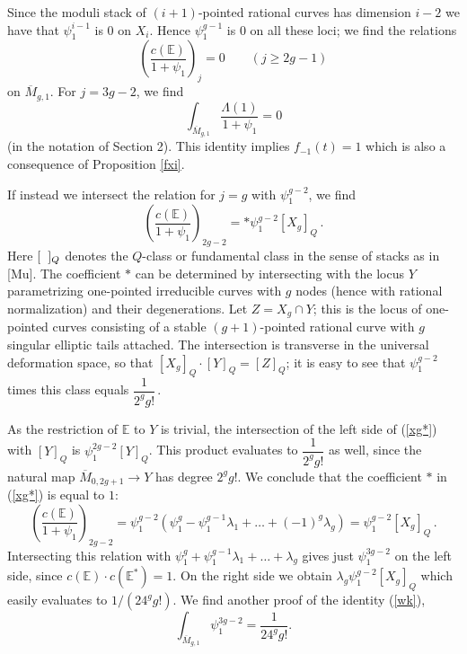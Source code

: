 \documentclass[11 pt]{amsart}
\newcommand{\HH}{\Lambda}
\newcommand{\hodge}{\mathbb{E}}
\begin{document}
Since the moduli stack of $(i+1)$-pointed rational curves has dimension
$i-2$ we have that $\psi_1^{i-1}$ is 0 on $X_i$. Hence $\psi_1^{g-1}$
is 0 on all these loci; we find the relations
$$\left(\frac{c(\hodge)}{1+\psi_1}\right)_j=0\qquad(j\ge 2g-1)$$
on $\overline{M}_{g,1}$. For $j=3g-2$,
we find 
\begin{equation}
\label{zeroz}
 \int_{\overline{M}_{g,1}} \frac{\HH(1)}{1+\psi_1} = 0
\end{equation}
(in the notation of Section 2).
This identity implies $f_{-1}(t) = 1$  which is also a
consequence of Proposition \ref{fxi}.


If instead we intersect the relation for $j=g$ with $\psi_1^{g-2}$, we
find
\begin{equation} \label{xg*}
\left(\frac{c(\hodge)}{1+\psi_1}\right)_{2g-2}=*\psi_1^{g-2}[X_g]_Q\,.
\end{equation}
Here $[\hphantom{x}]_Q$ denotes the $Q$-class or fundamental class in the
sense of stacks as in [Mu]. The coefficient $*$ can be determined
by intersecting with the locus $Y$ parametrizing one-pointed
irreducible curves with $g$ nodes (hence with rational normalization)
and their degenerations. Let $Z=X_g\cap Y$; this is the locus
of one-pointed curves consisting of a stable $(g+1)$-pointed
rational curve with $g$ singular elliptic tails attached. The intersection
is transverse in the universal deformation space, so that
$[X_g]_Q\cdot[Y]_Q=[Z]_Q$; it is easy to see that $\psi_1^{g-2}$
times this class equals $\dfrac1{2^gg!}\,$.


As the restriction of $\hodge$ to $Y$ is trivial, the
intersection of the left side of
(\ref{xg*}) with $[Y]_Q$ is $\psi_1^{2g-2}[Y]_Q$.
This product  evaluates
to $\dfrac1{2^gg!}$ as well, since the natural map $\overline{M}_{0,2g+1}
\to Y$ has degree $2^gg!$. We conclude that the coefficient $*$
in (\ref{xg*}) is equal to $1$:
\begin{equation} \label{xg}
\left(\frac{c(\hodge)}{1+\psi_1}\right)_{2g-2}=
\psi_1^{g-2}(\psi_1^g-\psi_1^{g-1}\lambda_1+\dots+(-1)^g\lambda_g)=
\psi_1^{g-2}[X_g]_Q\,.
\end{equation}
Intersecting this relation with 
$\psi_1^g+\psi_1^{g-1}\lambda_1+\dots+\lambda_g$ gives just
$\psi_1^{3g-2}$ on the left  side, since $c(\hodge)
\cdot c(\hodge^*)=1$.
On the right side we obtain $\lambda_g\psi_1^{g-2}[X_g]_Q$ which
easily  evaluates
to $1/(24^gg!)$. We find another proof of the identity (\ref{wk}),
$$\int_{\overline{M}_{g,1}} \psi_1^{3g-2}=\frac1{24^gg!}.$$
\end{document}
